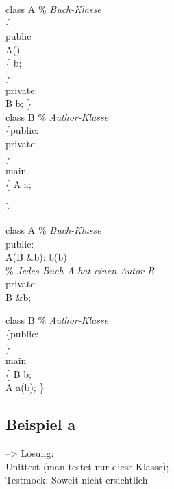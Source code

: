 \newpage

\begin{multicols}{2}
class A \% \textit{Buch-Klasse} \\
\{ \\
public \\
	A() \\
	\{ b; \\ 
	\} \\
private: \\
B b; 
\} \\

class B \% \textit{Author-Klasse} \\
\{public: \\
private:\\
\} \\

main \\
\{
A a;

\}
\columnbreak

class A  \% \textit{Buch-Klasse} \\
{
public: \\
A(B \&b): b(b)  \\
\% \textit{Jedes Buch A hat einen Autor B} \\
private: \\
B \&b; \\
}

class B \% \textit{Author-Klasse} \\
\{public: \\
\} \\

main \\
\{
B b; \\
A a(b); 
\} \\
\end{multicols}

\subsection{Beispiel a}
--> Lösung: \\
Unittest (man testet nur diese Klasse); \\
Testmock: Soweit nicht ersichtlich  

